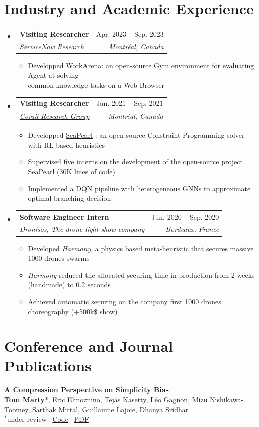 \documentclass[letterpaper,11pt]{article}
\makeatletter
\newcommand{\resumeItem}[1]{
  \item\small{
    {#1 \vspace{-2pt}}
  }
}
\newcommand{\resumeSubheading}[4]{
  \vspace{-2pt}\item
    \begin{tabular*}{0.97\textwidth}[t]{l@{\extracolsep{\fill}}r}
      \textbf{#1} & #2 \\
      \textit{\small#3} & \textit{\small #4} \\
    \end{tabular*}\vspace{-7pt}
}
\newcommand{\resumeSubHeadingListStart}{\begin{itemize}[leftmargin=0.15in, label={}]}
\newcommand{\resumeSubHeadingListEnd}{\end{itemize}}
\newcommand{\resumeItemListStart}{\begin{itemize}}
\newcommand{\resumeItemListEnd}{\end{itemize}\vspace{-5pt}}
\makeatother
\begin{document}
\section{Industry and Academic Experience}
  \resumeSubHeadingListStart
      \resumeSubheading
      {Visiting Researcher}{Apr. 2023 -- Sep. 2023}
      {\href{https://corail-research.github.io/}{ServiceNow Research}}{Montréal, Canada}
    \resumeItemListStart
        \resumeItem{Developped WorkArena: an open-source Gym environment for evaluating Agent at solving \\ common-knowledge tasks on a Web Browser}
      \resumeItemListEnd
      \resumeSubheading
      {Visiting Researcher}{Jan. 2021 -- Sep. 2021}
      {\href{https://corail-research.github.io/}{Corail Research Group}}{Montréal, Canada}
    \resumeItemListStart 
        \resumeItem{Developped \href{https://github.com/corail-research/SeaPearl.jl}{SeaPearl} : an open-source Constraint Programming solver with RL-based heuristics}
        \resumeItem{Supervised five interns on the development of the open-source project \href{https://github.com/corail-research/SeaPearl.jl}{SeaPearl}  (30K lines of code)}
        \resumeItem{Implemented a DQN pipeline with heterogeneous GNNs to approximate optimal branching decision}
    \resumeItemListEnd
    \resumeSubheading
      {Software Engineer Intern}{Jun. 2020 -- Sep. 2020}
      {Dronisos, The drone light show company}{Bordeaux, France}
      \resumeItemListStart
        \resumeItem{Developed \textit{Harmony}, a physics based meta-heuristic that secures massive 1000 drones swarms }
                \resumeItem{\textit{Harmony} reduced the allocated securing time in production from 2 weeks (handmade) to 0.2 seconds}
        \resumeItem{Achieved automatic securing on the company first 1000 drones choreography (+500k\$ show)}
      \resumeItemListEnd
    
  \resumeSubHeadingListEnd


\section{Conference and Journal Publications}
\begin{tcolorbox}[enhanced, rounded corners, colback=white, colframe=black!10!white, boxrule=0.5mm, left=10pt, right=10pt, top=6pt, bottom=3pt]
    \textbf{A Compression Perspective on Simplicity Bias} \\
    \textbf{Tom Marty}*, Eric Elmoznino, Tejas Kasetty, Léo Gagnon, Mizu Nishikawa-Toomey, Sarthak Mittal, Guillaume Lajoie, Dhanya Sridhar \\
    $^*$under review \hfill  \faCode  \, \href{https://github.com/3rdCore/complicity}{Code}  \quad
    \faFilePdf \, \href{http://arxiv.org/abs/2603.25839}{PDF}
\end{tcolorbox}
\end{document}
